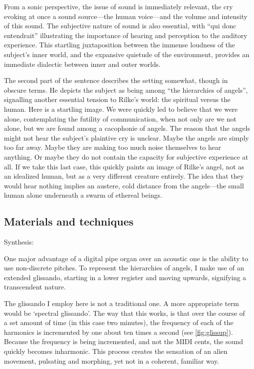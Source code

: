\documentclass[12pt,twoside,maitrise]{dms_ks}
\theoremstyle{definition}
\begin{document}
{{From a sonic perspective, the issue of sound is immediately relevant, the cry evoking at once a sound source---the human voice---and the volume and intensity of this sound.
The subjective nature of sound is also essential, with “qui donc entendrait” illustrating the importance of hearing and perception to the auditory experience.
This startling juxtaposition between the immense loudness of the subject's inner world, and the expansive quietude of the environment, provides an immediate dialectic between inner and outer worlds.

The second part of the sentence describes the setting somewhat, though in obscure terms.
He depicts the subject as being among “the hierarchies of angels”, signalling another essential tension to Rilke's world: the spiritual versus the human.
Here is a startling image.
We were quickly led to believe that we were alone, contemplating the futility of communication, when not only are we not alone, but we are found among a cacophonie of angels.
The reason that the angels might not hear the subject's plaintive cry is unclear. 
Maybe the angels are simply too far away.
Maybe they are making too much noise themselves to hear anything.
Or maybe they do not contain the capacity for subjective experience at all.
If we take this last case, this quickly paints an image of Rilke's angel, not as an idealized human, but as a very different creature entirely.
The idea that they would hear nothing implies an austere, cold distance from the angels---the small human alone underneath a swarm of ethereal beings.

\subsection{Materials and techniques}

Synthesis:

One major advantage of a digital pipe organ over an acoustic one is the ability to use non-discrete pitches.
To represent the hierarchies of angels, I make use of an extended glissando, starting in a lower register and moving upwards, signifying a transcendent nature.

The glissando I employ here is not a traditional one. 
A more appropriate term would be `spectral glissando'. 
The way that this works, is that over the course of a set amount of time (in this case two minutes), the frequency of each of the harmonics is incremented by one about ten times a second (see \cref{fig:glissup}).
Because the frequency is being incremented, and not the MIDI cents, the sound quickly becomes inharmonic.
This process creates the sensation of an alien movement, pulsating and morphing, yet not in a coherent, familiar way.

}}
\end{document}
